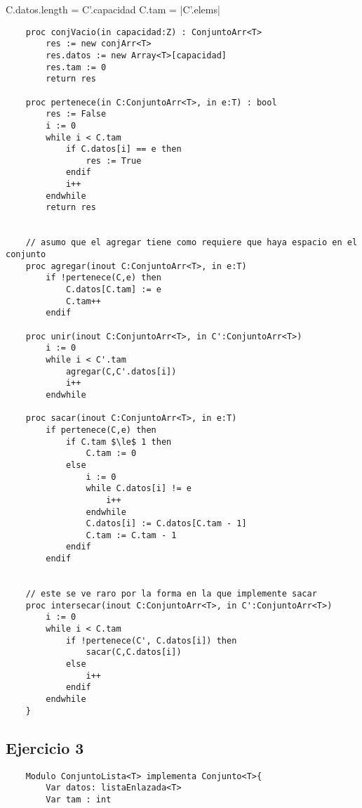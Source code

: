 \documentclass[10pt,a4paper]{article}
\begin{document}
{}

{C.datos.length = C'.capacidad \land C.tam = |C'.elems|\\ 
}

{}

\begin{lstlisting}
	proc conjVacio(in capacidad:Z) : ConjuntoArr<T>
		res := new conjArr<T>
		res.datos := new Array<T>[capacidad]
		res.tam := 0
		return res

	proc pertenece(in C:ConjuntoArr<T>, in e:T) : bool
		res := False
		i := 0
		while i < C.tam
			if C.datos[i] == e then
				res := True
			endif
			i++
		endwhile
		return res


	// asumo que el agregar tiene como requiere que haya espacio en el conjunto
	proc agregar(inout C:ConjuntoArr<T>, in e:T) 
		if !pertenece(C,e) then
			C.datos[C.tam] := e
			C.tam++
		endif

	proc unir(inout C:ConjuntoArr<T>, in C':ConjuntoArr<T>)
		i := 0
		while i < C'.tam
			agregar(C,C'.datos[i])
			i++
		endwhile

	proc sacar(inout C:ConjuntoArr<T>, in e:T)
		if pertenece(C,e) then
			if C.tam $\le$ 1 then
				C.tam := 0
			else
				i := 0 
				while C.datos[i] != e
					i++
				endwhile
				C.datos[i] := C.datos[C.tam - 1]
				C.tam := C.tam - 1
			endif
		endif


	// este se ve raro por la forma en la que implemente sacar
	proc intersecar(inout C:ConjuntoArr<T>, in C':ConjuntoArr<T>) 
		i := 0 
		while i < C.tam
			if !pertenece(C', C.datos[i]) then
				sacar(C,C.datos[i])
			else
				i++
			endif
		endwhile
	}
\end{lstlisting}

\subsection{Ejercicio 3}

\begin{lstlisting}
	Modulo ConjuntoLista<T> implementa Conjunto<T>{
		Var datos: listaEnlazada<T>
		Var tam : int
		
\end{lstlisting}
\end{document}
